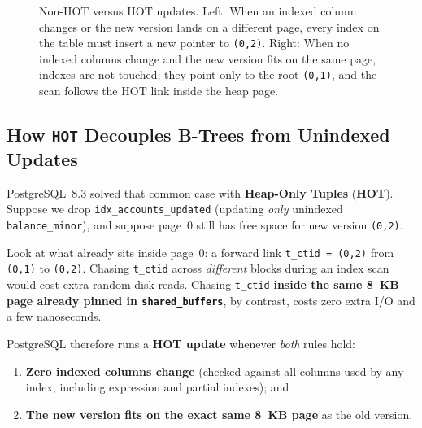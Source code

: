 \begin{figure}[htbp]
\caption{Non-HOT versus HOT updates. Left: When an indexed column changes or the new version lands on a different page, every index on the table must insert a new pointer to \texttt{(0,2)}. Right: When no indexed columns change and the new version fits on the same page, indexes are not touched; they point only to the root \texttt{(0,1)}, and the scan follows the HOT link inside the heap page.}
\label{ch05:fig-hot-update}
\end{figure}

\subsection{How \texttt{HOT} Decouples B-Trees from Unindexed Updates}

PostgreSQL~8.3 solved that common case with \textbf{Heap-Only Tuples} (\textbf{HOT}). Suppose we drop \texttt{idx\_accounts\_updated} (updating \emph{only} unindexed \texttt{balance\_minor}), and suppose page~0 still has free space for new version \texttt{(0,2)}.

Look at what already sits inside page~0: a forward link \texttt{t\_ctid = (0,2)} from \texttt{(0,1)} to \texttt{(0,2)}. Chasing \texttt{t\_ctid} across \emph{different} blocks during an index scan would cost extra random disk reads. Chasing \texttt{t\_ctid} \textbf{inside the same 8~KB page already pinned in \texttt{shared\_buffers}}, by contrast, costs zero extra I/O and a few nanoseconds.

PostgreSQL therefore runs a \textbf{HOT update} whenever \emph{both} rules hold:
\begin{enumerate}
  \item \textbf{Zero indexed columns change} (checked against all columns used by any index, including expression and partial indexes); and
  \item \textbf{The new version fits on the exact same 8~KB page} as the old version.
\end{enumerate}

